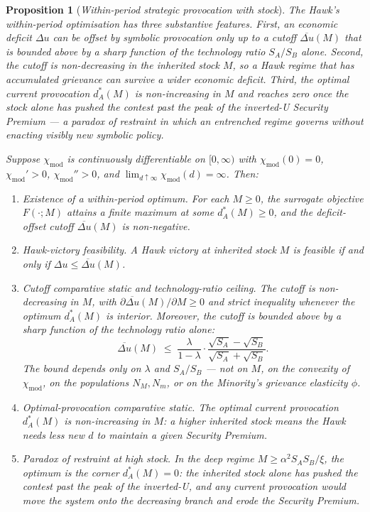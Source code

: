 \documentclass[11pt,twoside]{extarticle}
\newtheorem{proposition}{Proposition}
\begin{document}
\begin{proposition}[\emph{Within-period strategic provocation with stock}]\label{prop:provocation_v2}
\emph{The Hawk's within-period optimisation has three substantive features. First, an economic deficit $\Delta u$ can be offset by symbolic provocation only up to a cutoff $\overline{\Delta u}(M)$ that is bounded above by a sharp function of the technology ratio $S_A/S_B$ alone. Second, the cutoff is non-decreasing in the inherited stock $M$, so a Hawk regime that has accumulated grievance can survive a wider economic deficit. Third, the optimal current provocation $d_A^*(M)$ is non-increasing in $M$ and reaches zero once the stock alone has pushed the contest past the peak of the inverted-U Security Premium --- a \emph{paradox of restraint} in which an entrenched regime governs without enacting visibly new symbolic policy.}

\smallskip
Suppose $\chi_{\mathrm{mod}}$ is continuously differentiable on $[0,\infty)$ with $\chi_{\mathrm{mod}}(0)=0$, $\chi_{\mathrm{mod}}'>0$, $\chi_{\mathrm{mod}}''>0$, and $\lim_{d\uparrow\infty}\chi_{\mathrm{mod}}(d)=\infty$. Then:
\begin{enumerate}[label=(\roman*)]
    \item \textit{Existence of a within-period optimum.} For each $M\ge 0$, the surrogate objective $F(\cdot;M)$ attains a finite maximum at some $d_A^*(M)\ge 0$, and the deficit-offset cutoff $\overline{\Delta u}(M)$ is non-negative.
    \item \textit{Hawk-victory feasibility.} A Hawk victory at inherited stock $M$ is feasible if and only if $\Delta u\le\overline{\Delta u}(M)$.
    \item \textit{Cutoff comparative static and technology-ratio ceiling.} The cutoff is non-decreasing in $M$, with $\partial\overline{\Delta u}(M)/\partial M\ge 0$ and strict inequality whenever the optimum $d_A^*(M)$ is interior. Moreover, the cutoff is bounded above by a sharp function of the technology ratio alone:
    \begin{equation}\label{eq:dubar_bound_v2}
        \overline{\Delta u}(M)\;\le\;\frac{\lambda}{1-\lambda}\cdot\frac{\sqrt{S_A}-\sqrt{S_B}}{\sqrt{S_A}+\sqrt{S_B}}.
    \end{equation}
    The bound depends only on $\lambda$ and $S_A/S_B$ --- not on $M$, on the convexity of $\chi_{\mathrm{mod}}$, on the populations $N_M, N_m$, or on the Minority's grievance elasticity $\phi$.
    \item \textit{Optimal-provocation comparative static.} The optimal current provocation $d_A^*(M)$ is non-increasing in $M$: a higher inherited stock means the Hawk needs less new $d$ to maintain a given Security Premium.
    \item \textit{Paradox of restraint at high stock.} In the deep regime $M\ge\alpha^2 S_A S_B/\xi$, the optimum is the corner $d_A^*(M)=0$: the inherited stock alone has pushed the contest past the peak of the inverted-U, and any current provocation would move the system onto the decreasing branch and erode the Security Premium.
\end{enumerate}
\end{proposition}
\end{document}
